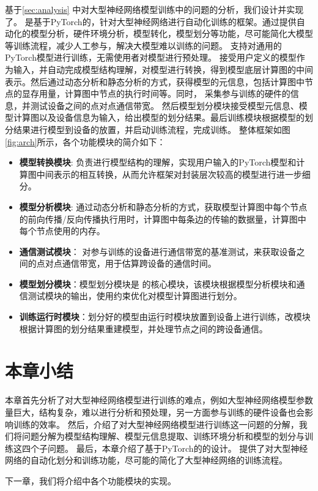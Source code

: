 基于\ref{sec:analysis} 中对大型神经网络模型训练中的问题的分析，我们设计并实现了\sys{}。
\sys{} 是基于PyTorch的，针对大型神经网络进行自动化训练的框架。通过提供自动化的模型分析，硬件环境分析，模型转化，模型划分等功能，尽可能简化大模型等训练流程，减少人工参与，解决大模型难以训练的问题。
\sys{} 支持对通用的PyTorch模型进行训练，无需使用者对模型进行预处理。
\sys{}接受用户定义的模型作为输入，并自动完成模型结构理解，对模型进行转换，得到模型底层计算图的中间表示。然后通过动态分析和静态分析的方式，获得模型的元信息，包括计算图中节点的显存用量，计算图中节点的执行时间等。同时，\sys{} 采集参与训练的硬件的信息，并测试设备之间的点对点通信带宽。
然后模型划分模块接受模型元信息、模型计算图以及设备信息为输入，给出模型的划分结果。最后训练模块根据模型的划分结果进行模型到设备的放置，并启动训练流程，完成训练。
整体框架如图 \ref{fig:arch}所示，各个功能模块的简介如下：
\begin{itemize}
	\item \textbf{模型转换模块}: 负责进行模型结构的理解，实现用户输入的PyTorch模型和计算图中间表示的相互转换，从而允许框架对封装层次较高的模型进行进一步细分。
	\item \textbf{模型分析模块}: 通过动态分析和静态分析的方式，获取模型计算图中每个节点的前向传播/反向传播执行用时，计算图中每条边的传输的数据量，计算图中每个节点使用的内存。
	\item \textbf{通信测试模块}： 对参与训练的设备进行通信带宽的基准测试，来获取设备之间的点对点通信带宽，用于估算跨设备的通信时间。
	\item \textbf{模型划分模块}：模型划分模块是\sys{} 的核心模块，该模块根据模型分析模块和通信测试模块的输出，使用约束优化对模型计算图进行划分。
	\item \textbf{训练运行时模块}：划分好的模型由运行时模块放置到设备上进行训练，改模块根据计算图的划分结果重建模型，并处理节点之间的跨设备通信。
\end{itemize}

\section{本章小结}
本章首先分析了对大型神经网络模型进行训练的难点，例如大型神经网络模型参数量巨大，结构复杂，难以进行分析和预处理，另一方面参与训练的硬件设备也会影响训练的效率。
然后，介绍了对大型神经网络模型进行训练这一问题的分解，我们将问题分解为模型结构理解、模型元信息提取、训练环境分析和模型的划分与训练这四个子问题。
最后，本章介绍了基于PyTorch的\sys{}的设计。
\sys{}提供了对大型神经网络的自动化划分和训练功能，尽可能的简化了大型神经网络的训练流程。

下一章，我们将介绍\sys{}中各个功能模块的实现。